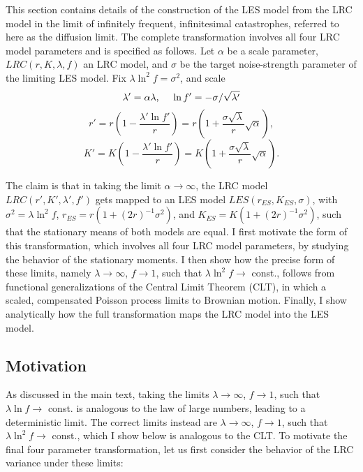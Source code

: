 This section contains details of the construction of the LES model from the LRC model in the limit of infinitely frequent, infinitesimal catastrophes, referred to here as the diffusion limit.  The complete transformation involves all four LRC model parameters and is specified as follows.  Let $\alpha$ be a scale parameter, $LRC(r,K,\lambda,f)$ an LRC model, and $\sigma$ be the target noise-strength parameter of the limiting LES model.  Fix $\lambda\ln^2 f = \sigma^2$, and scale
\begin{equation*}
\lambda' = \alpha \lambda,\text{\hspace{.4cm}}\ln f' = -\sigma/\sqrt{\lambda'}
\end{equation*}
\begin{equation*}
r' = r\left(1- \frac{\lambda'\ln f'}{r}\right) = r\left(1+ \frac{\sigma\sqrt{\lambda}}{r}\sqrt{\alpha}\right),
\end{equation*}
\begin{equation}
K' = K\left(1  -\frac{\lambda'\ln f'}{r}\right) = K\left(1+ \frac{\sigma\sqrt{\lambda}}{r}\sqrt{\alpha}\right).
\end{equation}


\noindent The claim is that in taking the limit $\alpha \to \infty$, the LRC model $LRC(r',K',\lambda',f')$ gets mapped to an LES model $LES(r_{ES},K_{ES},\sigma)$, with $\sigma^2 = \lambda\ln^2f$, $r_{ES} = r(1+(2r)^{-1}\sigma^2)$, and $K_{ES} = K(1+(2r)^{-1}\sigma^2)$, such that the stationary means of both models are equal. I first motivate the form of this transformation, which involves all four LRC model parameters, by studying the behavior of the stationary moments.  I then show how the precise form of these limits, namely $\lambda\to\infty$, $f\to 1$, such that $\lambda\ln^2f\to$ const., follows from functional generalizations of the Central Limit Theorem (CLT), in which a scaled, compensated Poisson process limits to Brownian motion.  Finally, I show analytically how the full transformation maps the LRC model into the LES model.  

\subsection{Motivation}

As discussed in the main text, taking the limits $\lambda\to\infty$, $f\to 1$, such that $\lambda\ln f\to$ const. is analogous to the law of large numbers, leading to a deterministic limit.  The correct limits instead are $\lambda\to\infty$, $f\to 1$, such that $\lambda\ln^2f\to$ const., which I show below is analogous to the CLT.  To motivate the final four parameter transformation, let us first consider the behavior of the LRC variance under these limits:

